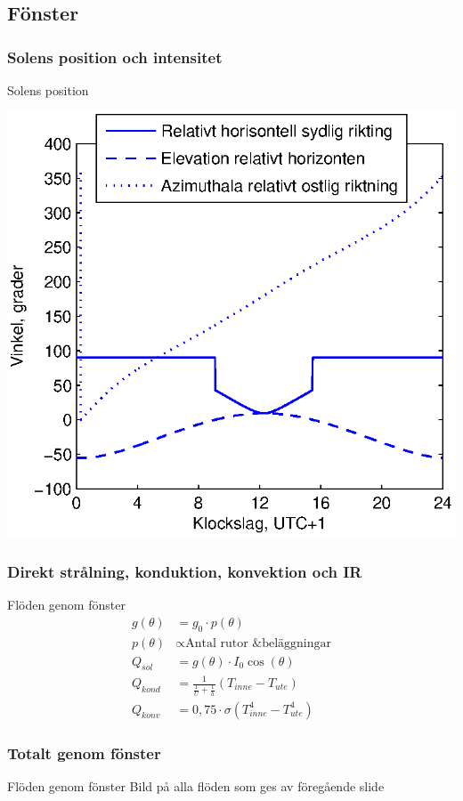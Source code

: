 \subsection{Fönster}

\subsubsection{Solens position och intensitet}
\begin{frame}{Solens position}
  \begin{center}
  \includegraphics[scale=0.8]{images/sunposition1231.eps}
  \end{center}
\end{frame}

\subsubsection{Direkt strålning, konduktion, konvektion och IR}
\begin{frame}{Flöden genom fönster}
  \begin{align*}
    g\left( \theta \right) & = g_0 \cdot p\left( \theta \right)\\[10pt]
    p\left( \theta \right) & \propto \text{Antal rutor \& beläggningar}\\[10pt]
    Q_{sol} \,\,\,\, & = g\left( \theta \right) \cdot I_0 \cos{\left( \theta \right)}\\[10pt]
    Q_{kond} & = \frac{1}{\frac{1}{U}+\frac{1}{h}} \left( T_{inne} - T_{ute}\right)\\[10pt]
    Q_{konv} & = 0,75 \cdot \sigma \left( T_{inne}^4 - T_{ute}^4\right)
  \end{align*}
\end{frame}


\subsubsection{Totalt genom fönster}
\begin{frame}{Flöden genom fönster}
  Bild på alla flöden som ges av föregående slide
\end{frame}
